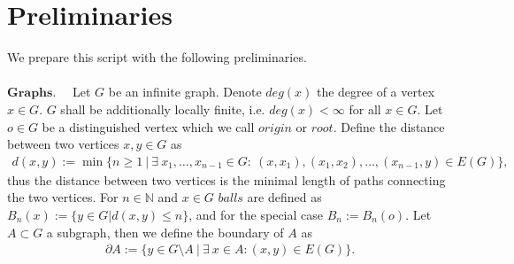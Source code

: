 \documentclass[12pt,a4paper]{scrartcl}
\numberwithin{equation}{section}
\numberwithin{equation}{section}%
\theoremstyle{definition}
\theoremstyle{definition}
\begin{document}
\newpage


\section{Preliminaries}

We prepare this script with the following preliminaries. \\
\\
$\boldsymbol{Graphs}.\quad$ Let $G$ be an infinite graph. Denote $deg(x)$ the degree of a vertex $x\in G$. $G$ shall be additionally locally finite, i.e. $deg(x)<\infty$ for all $x\in G$. Let $o\in G$ be a distinguished vertex which we call $origin$ or $root$. Define the distance between two vertices $x,y\in G$ as 
\begin{align*}
	d(x,y):=\min \{n\geq 1\ |\ \exists\ x_1,\dots, x_{n-1}\in G:\ (x,x_1), (x_1,x_2),\dots, (x_{n-1},y) \in E(G)\},
\end{align*}
thus the distance between two vertices is the minimal length of paths connecting the two vertices. For $n\in \mathbb{N}$ and $x\in G$ $balls$ are defined as $B_n(x):=\{y\in G|d(x,y)\leq n\}$, and for the special case $B_n:=B_n(o)$. Let $A\subset G$ a subgraph, then we define the boundary of $A$ as
\begin{align*}
	\partial A := \{y\in G\setminus A\ |\ \exists\ x\in A: (x,y)\in E(G)\}.
\end{align*}
\end{document}
